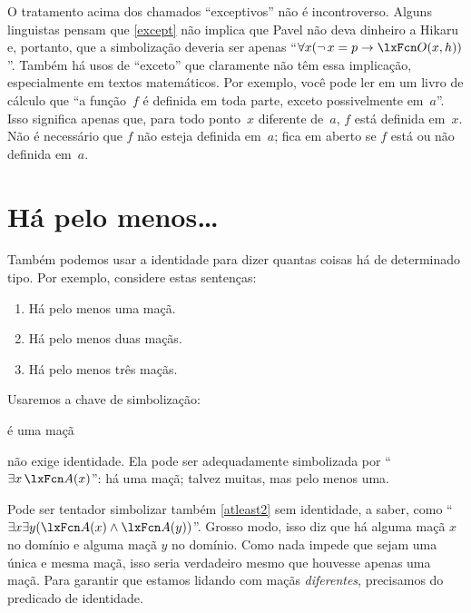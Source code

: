 O tratamento acima dos chamados \textquotedblleft exceptivos\textquotedblright{} não é incontroverso. Alguns linguistas pensam que \cref*{except} não implica que Pavel não deva dinheiro a Hikaru e, portanto, que a simbolização deveria ser apenas \textquotedblleft $\forall x(\enot\, {x = p} \eif \atom{O}{x,h})$\textquotedblright{}. Também há usos de \textquotedblleft exceto\textquotedblright{} que claramente não têm essa implicação, especialmente em textos matemáticos. Por exemplo, você pode ler em um livro de cálculo que \textquotedblleft a função~$f$ é definida em toda parte, exceto possivelmente em~$a$\textquotedblright{}. Isso significa apenas que, para todo ponto~$x$ diferente de~$a$, $f$ está definida em~$x$. Não é necessário que $f$ não esteja definida em~$a$; fica em aberto se $f$ está ou não definida em~$a$.

\section{Há pelo menos\ldots}
Também podemos usar a identidade para dizer quantas coisas há de determinado tipo. Por exemplo, considere estas sentenças:
\begin{enumerate}
\item\label{atleast1} Há pelo menos uma maçã.
\item\label{atleast2} Há pelo menos duas maçãs.
\item\label{atleast3} Há pelo menos três maçãs.
\end{enumerate}
Usaremos a chave de simbolização:
	\begin{ekey}
\item[\atom{A}{x}]  é uma maçã
	\end{ekey}
 não exige identidade. Ela pode ser adequadamente simbolizada por \textquotedblleft $\exists x\, \atom{A}{x}$\textquotedblright{}: há uma maçã; talvez muitas, mas pelo menos uma.

Pode ser tentador simbolizar também \cref*{atleast2} sem identidade, a saber, como \textquotedblleft $\exists x \exists y(\atom{A}{x} \eand \atom{A}{y})$\textquotedblright{}. Grosso modo, isso diz que há alguma maçã $x$ no domínio e alguma maçã $y$ no domínio. Como nada impede que sejam uma única e mesma maçã, isso seria verdadeiro mesmo que houvesse apenas uma maçã. Para garantir que estamos lidando com maçãs \emph{diferentes}, precisamos do predicado de identidade.






